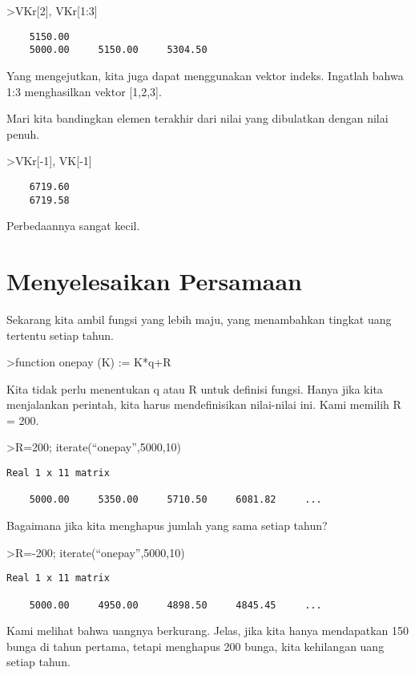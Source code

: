 \documentclass[
]{book}
\begin{document}
\textgreater VKr{[}2{]}, VKr{[}1:3{]}

\begin{verbatim}
    5150.00 
    5000.00     5150.00     5304.50 
\end{verbatim}

Yang mengejutkan, kita juga dapat menggunakan vektor indeks. Ingatlah bahwa 1:3 menghasilkan vektor {[}1,2,3{]}.

Mari kita bandingkan elemen terakhir dari nilai yang dibulatkan dengan nilai penuh.

\textgreater VKr{[}-1{]}, VK{[}-1{]}

\begin{verbatim}
    6719.60 
    6719.58 
\end{verbatim}

Perbedaannya sangat kecil.

\chapter{Menyelesaikan Persamaan}\label{menyelesaikan-persamaan}

Sekarang kita ambil fungsi yang lebih maju, yang menambahkan tingkat uang tertentu setiap tahun.

\textgreater function onepay (K) := K*q+R

Kita tidak perlu menentukan q atau R untuk definisi fungsi. Hanya jika kita menjalankan perintah, kita harus mendefinisikan nilai-nilai ini. Kami memilih R = 200.

\textgreater R=200; iterate(``onepay'',5000,10)

\begin{verbatim}
Real 1 x 11 matrix

    5000.00     5350.00     5710.50     6081.82     ...
\end{verbatim}

Bagaimana jika kita menghapus jumlah yang sama setiap tahun?

\textgreater R=-200; iterate(``onepay'',5000,10)

\begin{verbatim}
Real 1 x 11 matrix

    5000.00     4950.00     4898.50     4845.45     ...
\end{verbatim}

Kami melihat bahwa uangnya berkurang. Jelas, jika kita hanya mendapatkan 150 bunga di tahun pertama, tetapi menghapus 200 bunga, kita kehilangan uang setiap tahun.
\end{document}
